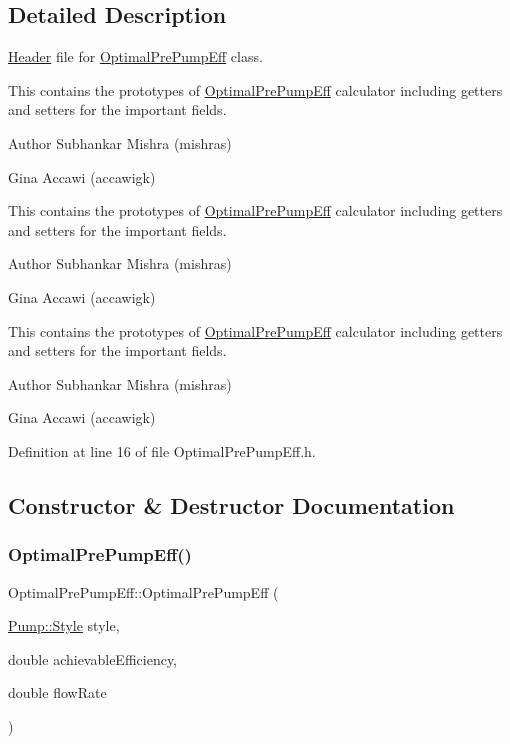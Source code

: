 \subsection{Detailed Description}
\hyperlink{class_header}{Header} file for \hyperlink{class_optimal_pre_pump_eff}{Optimal\+Pre\+Pump\+Eff} class. 

This contains the prototypes of \hyperlink{class_optimal_pre_pump_eff}{Optimal\+Pre\+Pump\+Eff} calculator including getters and setters for the important fields.

\begin{DoxyAuthor}{Author}
Subhankar Mishra (mishras) 

Gina Accawi (accawigk) 
\end{DoxyAuthor}


This contains the prototypes of \hyperlink{class_optimal_pre_pump_eff}{Optimal\+Pre\+Pump\+Eff} calculator including getters and setters for the important fields.

\begin{DoxyAuthor}{Author}
Subhankar Mishra (mishras) 

Gina Accawi (accawigk) 
\end{DoxyAuthor}


This contains the prototypes of \hyperlink{class_optimal_pre_pump_eff}{Optimal\+Pre\+Pump\+Eff} calculator including getters and setters for the important fields.

\begin{DoxyAuthor}{Author}
Subhankar Mishra (mishras) 

Gina Accawi (accawigk) 
\end{DoxyAuthor}


Definition at line 16 of file Optimal\+Pre\+Pump\+Eff.\+h.



\subsection{Constructor \& Destructor Documentation}
\mbox{\label{class_optimal_pre_pump_eff_ade47f817645cb2d503bd99f132bec1e6}} 
\subsubsection{\texorpdfstring{Optimal\+Pre\+Pump\+Eff()}{OptimalPrePumpEff()}\hspace{0.1cm}{\footnotesize\ttfamily [1/3]}}
{\footnotesize\ttfamily Optimal\+Pre\+Pump\+Eff\+::\+Optimal\+Pre\+Pump\+Eff (\begin{DoxyParamCaption}\item[{\hyperlink{class_pump_aef354601ce4218258cc898b35a1e90ff}{Pump\+::\+Style}}]{style,  }\item[{double}]{achievable\+Efficiency,  }\item[{double}]{flow\+Rate }\end{DoxyParamCaption})\hspace{0.3cm}{\ttfamily [inline]}}

